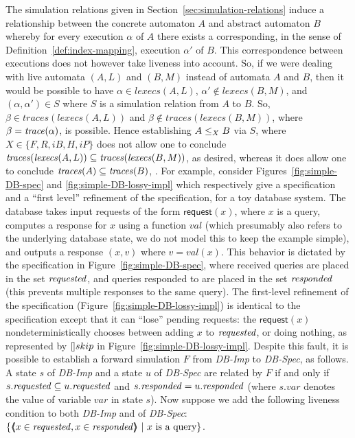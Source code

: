 \documentclass[11pt]{article}
\newcommand{\pair}[2]{\lpb #1, #2 \rpb}
\newcommand{\lpb}{\langle \hspace{-0.34em} \langle \hspace{-0.34em} \langle}
\newcommand{\rpb}{\rangle \hspace{-0.34em} \rangle \hspace{-0.34em} \rangle}
\newcommand{\al}{\alpha}
\newcommand{\execs}{\mathit{lexecs}}
\newcommand{\lexecs}{\mathit{lexecs}}
\newcommand{\traces}{\mathit{traces}}
\newcommand{\ms}[1]{\relax\ifmmode
                \mathord{\mathcode`\-="702D\it #1\mathcode`\-="2200}\else
{\it #1}\fi
}
\newcommand{\action}[1]{\textsf{#1}}
\newcommand{\statevar}[1]{\ms{#1}}
\newcommand{\dbspec}{\textit{DB-Spec}\xspace}
\newcommand{\dbimp}{\textit{DB-Imp}\xspace}
\newcommand{\request}{\action{request}}
\newcommand{\requested}{\statevar{requested}}
\newcommand{\responded}{\statevar{responded}}
\begin{document}
The simulation relations given in
Section~\ref{sec:simulation-relations} induce a relationship between
the concrete automaton $A$ and abstract automaton $B$ whereby for
every execution $\al$ of $A$ there exists a corresponding, in the
sense of Definition~\ref{def:index-mapping}, execution $\al'$ of $B$.
This correspondence between executions does not however take liveness
into account. So, if we were dealing with live automata $(A,L)$ and
$(B,M)$ instead of automata $A$ and $B$, then it would be possible to
have $\al \in \lexecs(A,L)$, $\al' \not\in \lexecs(B,M)$, and
$(\al,\al') \in S$ where $S$ is a simulation relation from $A$ to $B$.
So, $\beta \in \traces(\execs(A,L))$ and $\beta \notin \traces(\execs(B,M))$,
where $\beta = \trace(\al)$, is possible.
Hence establishing 
$A \leq_X B$ via $S$, where $X \in \{F, R, iB, H, iP\}$
does not allow one to conclude 
 $\traces(\execs(A,L)) \sub \traces(\execs(B,M))$, as desired, 
whereas it does allow one to conclude 
$\traces(A) \sub \traces(B)$, \cite[Lemma 6.16]{GSSL93}.
For example, consider 
Figures~\ref{fig:simple-DB-spec} and \ref{fig:simple-DB-lossy-impl}
which respectively give a specification and a ``first level'' refinement of the
specification, for a toy database system. 
The database takes input requests of the form 
$\request(x)$, where $x$ is a query, computes a response for $x$ using
a function $val$ (which presumably also refers to the underlying
database state, we do not model this to keep the example simple), and
outputs a response $(x,v)$ where $v = val(x)$.
This behavior is dictated by the specification in 
Figure~\ref{fig:simple-DB-spec}, where received queries are placed in
the set $\requested$, and queries responded to are placed in the set
$\responded$ (this prevents multiple responses to the same query).
The first-level refinement of the specification 
(Figure~\ref{fig:simple-DB-lossy-impl}) 
is identical to the specification except that it can 
``lose'' pending requests: the $\request(x)$ nondeterministically
chooses between adding $x$ to $\requested$, or doing nothing, as
represented by $\mbox{$[\hspace*{-0.5pt}]$} skip$ in Figure~\ref{fig:simple-DB-lossy-impl}.
Despite this fault, it is possible to
establish a forward simulation $F$ from 
\dbimp to \dbspec, as follows.
A state $s$ of \dbimp and a state $u$
of \dbspec are related by $F$ if and only if
$s.\requested \sub u.\requested$ and $s.\responded = u.\responded$
(where $s.var$ denotes the value of variable $var$ in state $s$).
Now suppose we add the following liveness condition to both 
\dbimp and of \dbspec: 
$\{ \pair{x \in \requested}{x \in \responded} ~|~ \mbox{$x$ is a query} \}$.
\end{document}
